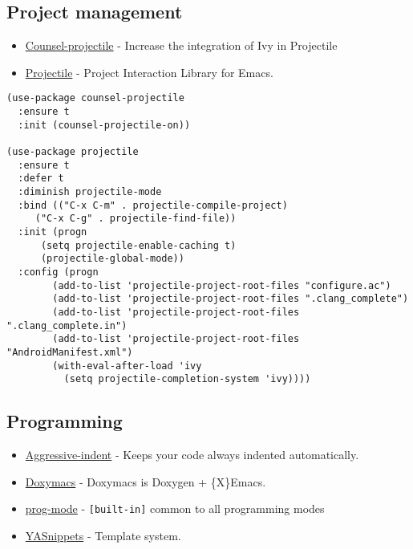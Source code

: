 \documentclass[11pt]{article}
\begin{document}
\subsection{Project management}
\label{sec-1-5}
\begin{itemize}
\item \href{https://github.com/ericdanan/counsel-projectile}{Counsel-projectile} - Increase the integration of Ivy in Projectile
\item \href{https://github.com/bbatsov/projectile}{Projectile} - Project Interaction Library for Emacs.
\end{itemize}

\begin{verbatim}
(use-package counsel-projectile
  :ensure t
  :init (counsel-projectile-on))

(use-package projectile
  :ensure t
  :defer t
  :diminish projectile-mode
  :bind (("C-x C-m" . projectile-compile-project)
	 ("C-x C-g" . projectile-find-file))
  :init (progn
	  (setq projectile-enable-caching t)
	  (projectile-global-mode))
  :config (progn
	    (add-to-list 'projectile-project-root-files "configure.ac")
	    (add-to-list 'projectile-project-root-files ".clang_complete")
	    (add-to-list 'projectile-project-root-files ".clang_complete.in")
	    (add-to-list 'projectile-project-root-files "AndroidManifest.xml")
	    (with-eval-after-load 'ivy
	      (setq projectile-completion-system 'ivy))))
\end{verbatim}

\subsection{Programming}
\label{sec-1-6}
\begin{itemize}
\item \href{https://github.com/Malabarba/aggressive-indent-mode}{Aggressive-indent} - Keeps your code always indented automatically.
\item \href{http://doxymacs.sourceforge.net/}{Doxymacs} - Doxymacs is Doxygen + \{X\}Emacs.
\item \href{https://www.emacswiki.org/emacs/ProgMode}{prog-mode} - \texttt{[built-in]} common to all programming modes
\end{itemize}
\begin{itemize}
\item \href{https://github.com/capitaomorte/yasnippet}{YASnippets} - Template system.
\end{itemize}
\end{document}
